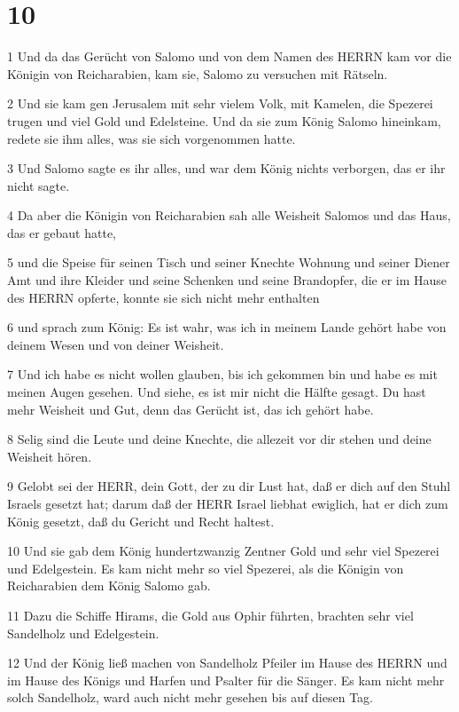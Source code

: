 \chapter{10}

\par 1 Und da das Gerücht von Salomo und von dem Namen des HERRN kam vor die Königin von Reicharabien, kam sie, Salomo zu versuchen mit Rätseln.
\par 2 Und sie kam gen Jerusalem mit sehr vielem Volk, mit Kamelen, die Spezerei trugen und viel Gold und Edelsteine. Und da sie zum König Salomo hineinkam, redete sie ihm alles, was sie sich vorgenommen hatte.
\par 3 Und Salomo sagte es ihr alles, und war dem König nichts verborgen, das er ihr nicht sagte.
\par 4 Da aber die Königin von Reicharabien sah alle Weisheit Salomos und das Haus, das er gebaut hatte,
\par 5 und die Speise für seinen Tisch und seiner Knechte Wohnung und seiner Diener Amt und ihre Kleider und seine Schenken und seine Brandopfer, die er im Hause des HERRN opferte, konnte sie sich nicht mehr enthalten
\par 6 und sprach zum König: Es ist wahr, was ich in meinem Lande gehört habe von deinem Wesen und von deiner Weisheit.
\par 7 Und ich habe es nicht wollen glauben, bis ich gekommen bin und habe es mit meinen Augen gesehen. Und siehe, es ist mir nicht die Hälfte gesagt. Du hast mehr Weisheit und Gut, denn das Gerücht ist, das ich gehört habe.
\par 8 Selig sind die Leute und deine Knechte, die allezeit vor dir stehen und deine Weisheit hören.
\par 9 Gelobt sei der HERR, dein Gott, der zu dir Lust hat, daß er dich auf den Stuhl Israels gesetzt hat; darum daß der HERR Israel liebhat ewiglich, hat er dich zum König gesetzt, daß du Gericht und Recht haltest.
\par 10 Und sie gab dem König hundertzwanzig Zentner Gold und sehr viel Spezerei und Edelgestein. Es kam nicht mehr so viel Spezerei, als die Königin von Reicharabien dem König Salomo gab.
\par 11 Dazu die Schiffe Hirams, die Gold aus Ophir führten, brachten sehr viel Sandelholz und Edelgestein.
\par 12 Und der König ließ machen von Sandelholz Pfeiler im Hause des HERRN und im Hause des Königs und Harfen und Psalter für die Sänger. Es kam nicht mehr solch Sandelholz, ward auch nicht mehr gesehen bis auf diesen Tag.

